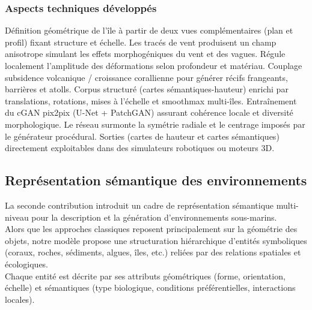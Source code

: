 \subsubsection*{Aspects techniques développés}
\begin{Itemize}
     Définition géométrique de l'île à partir de deux vues complémentaires (plan et profil) fixant structure et échelle.
     Les tracés de vent produisent un champ anisotrope simulant les effets morphogéniques du vent et des vagues.
     Régule localement l'amplitude des déformations selon profondeur et matériau.
     Couplage subsidence volcanique / croissance corallienne pour générer récifs frangeants, barrières et atolls.
     Corpus structuré (cartes sémantiques-hauteur) enrichi par translations, rotations, mises à l'échelle et smoothmax multi-îles.
     Entraînement du cGAN pix2pix (U-Net + PatchGAN) assurant cohérence locale et diversité morphologique.
     Le réseau surmonte la symétrie radiale et le centrage imposés par le générateur procédural.
     Sorties (cartes de hauteur et cartes sémantiques) directement exploitables dans des simulateurs robotiques ou moteurs 3D.
\end{Itemize}

\subsection*{Représentation sémantique des environnements}
La seconde contribution introduit un cadre de représentation sémantique multi-niveau pour la description et la génération d'environnements sous-marins. \\
Alors que les approches classiques reposent principalement sur la géométrie des objets, notre modèle propose une structuration hiérarchique d'entités symboliques (coraux, roches, sédiments, algues, îles, etc.) reliées par des relations spatiales et écologiques. \\
Chaque entité est décrite par ses attributs géométriques (forme, orientation, échelle) et sémantiques (type biologique, conditions préférentielles, interactions locales).

